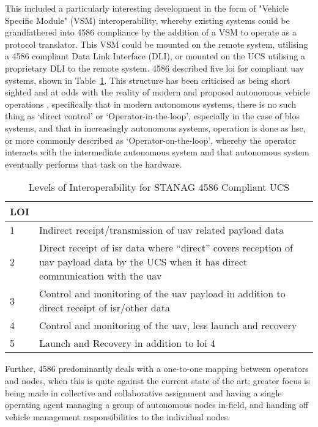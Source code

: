 This included a particularly interesting development in the form of "Vehicle Specific Module" (VSM) interoperability, whereby existing systems could be grandfathered into 4586 compliance by the addition of a VSM to operate as a protocol translator.
This VSM could be mounted on the remote system, utilising a 4586 compliant Data Link Interface (DLI), or mounted on the UCS utilising a proprietary DLI to the remote system.
4586 described five \acrshort{loi} for compliant \acrshort{uav} systems, shown in Table~\ref{tab:levels_of_interoperability}.
This structure has been criticised as being short sighted and at odds with the reality of modern and proposed autonomous vehicle operations \cite{Cummings2010}, specifically that in modern autonomous systems, there is no such thing as ‘direct control’ or ‘Operator-in-the-loop’, especially in the case of \acrfull{blos} systems, and that in increasingly autonomous systems, operation is done as \acrfull{hsc}, or more commonly described as ‘Operator-on-the-loop’, whereby the operator interacts with the intermediate autonomous system and that autonomous system eventually performs that task on the hardware.

\begin{table}
  \begin{tabularx}{\textwidth}{|l|X|}
    \hline  LOI &  \\ 
    \hline  1 &  Indirect receipt/transmission of \acrshort{uav} related payload data\\ 
    \hline  2 &  Direct receipt of \acrshort{isr} data where “direct” covers reception of \acrshort{uav} payload data by the UCS when it has direct communication with the \acrshort{uav}\\ 
    \hline  3 &  Control and monitoring of the \acrshort{uav} payload in addition to direct receipt of \acrshort{isr}/other data\\ 
    \hline  4 &  Control and monitoring of the \acrshort{uav}, less launch and recovery\\
    \hline  5 &  Launch and Recovery in addition to \acrshort{loi} 4\\ 
    \hline 
  \end{tabularx}
  \caption{Levels of Interoperability for STANAG 4586 Compliant UCS}
  \label{tab:levels_of_interoperability}
\end{table}


Further, 4586 predominantly deals with a one-to-one mapping between operators and nodes, when this is quite against the current state of the art; greater focus is being made in collective and collaborative assignment and having a single operating agent managing a group of autonomous nodes in-field, and handing off vehicle management responsibilities to the individual nodes.

